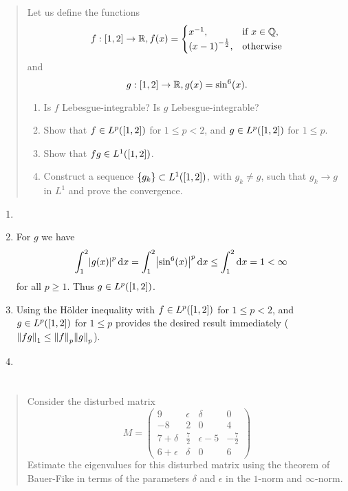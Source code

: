 \documentclass{exercise}
\begin{document}
	\begin{quote}
		Let us define the functions
		\[
			f: \brackets*{1, 2} \to \R, f\parentheses*{x} = \begin{cases}
				x^{-1}, & \text{if }x \in \Q,\\
				\parentheses*{x - 1}^{-\frac{1}{2}}, & \text{otherwise}
			\end{cases}
		\]
		and
		\[
			g: \brackets*{1, 2} \to \R, g\parentheses*{x} = \sin^6\parentheses*{x}.
		\]
		\begin{enumerate}
			\item Is \(f\) Lebesgue-integrable?
			Is \(g\) Lebesgue-integrable?
			\item Show that \(f \in L^p\parentheses*{\brackets*{1, 2}}\) for \(1 \le p < 2\), and \(g \in L^p\parentheses*{\brackets*{1, 2}}\) for \(1 \le p\).
			\item Show that \(fg \in L^1\parentheses*{\brackets*{1, 2}}\).
			\item Construct a sequence \(\braces*{g_k} \subset L^1\parentheses*{\brackets*{1, 2}}\), with \(g_k \ne g\), such that \(g_k \to g\) in \(L^1\) and prove the convergence.
		\end{enumerate}
	\end{quote}

	\begin{enumerate}
		\item
		\item For \(g\) we have
		\[
			\int_1^2 \absolute*{g\parentheses*{x}}^p \d x = \int_1^2 \absolute*{\sin^6\parentheses*{x}}^p \d x \le \int_1^2 \d x = 1 < \infty
		\]
		for all \(p \ge 1\). Thus \(g \in L^p\parentheses*{\brackets*{1, 2}}\).
		\item Using the Hölder inequality with \(f \in L^p\parentheses*{\brackets*{1, 2}}\) for \(1 \le p < 2\), and \(g \in L^p\parentheses*{\brackets*{1, 2}}\) for \(1 \le p\) provides the desired result immediately (\(\norm*{fg}_1 \le \norm*{f}_p \norm*{g}_p\)).
		\item 
	\end{enumerate}


	\section{}

	\begin{quote}
		Consider the disturbed matrix
		\[
			M = \begin{pmatrix}
				9 & \epsilon & \delta & 0\\
				-8 & 2 & 0 & 4\\
				7 + \delta & \frac{7}{2} & \epsilon - 5 & -\frac{7}{2}\\
				6 + \epsilon & \delta & 0 & 6
			\end{pmatrix}
		\]
		Estimate the eigenvalues for this disturbed matrix using the theorem of Bauer-Fike in terms of the parameters \(\delta\) and \(\epsilon\) in the \(1\)-norm and \(\infty\)-norm.
	\end{quote}
\end{document}
